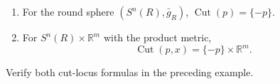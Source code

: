 \begin{example}
\label{ex:cut-loci}
\begin{enumerate}
\item[(a)] For the round sphere $(S^n(R),\bar g_R)$,
$\operatorname{Cut}(p)=\{-p\}$.
\item[(b)] For $S^n(R)\times\mathbb R^m$ with the product metric,
\[
\operatorname{Cut}(p,x)=\{-p\}\times\mathbb R^m.
\]
\end{enumerate}
\end{example}

\begin{exercise}
\label{exer:verify-cut-loci-claims}
Verify both cut-locus formulas in the preceding example.
\end{exercise}

